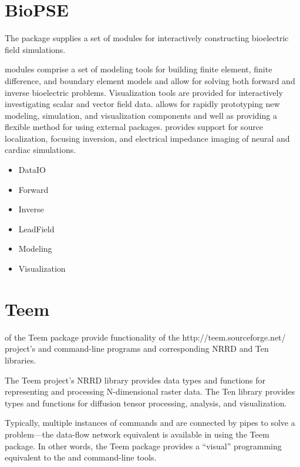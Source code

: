 \section{BioPSE}
\label{sec:biopsepackage}

The \BIOPSE{} package supplies a set of modules for interactively
constructing bioelectric field simulations.

\BIOPSE{} modules comprise a set of modeling tools for building finite element,
finite difference, and boundary element models and allow for solving
both forward and inverse bioelectric problems.  Visualization tools
are provided for interactively investigating scalar and vector field
data.  \BIOPSE{} allows for rapidly prototyping new modeling, simulation,
and visualization components and well as providing a flexible method for using
external packages.  \BIOPSE{} provides support for source localization,
focusing inversion, and electrical impedance imaging of neural and
cardiac simulations.


\begin{itemize}
\item DataIO
\item Forward
\item Inverse
\item LeadField
\item Modeling
\item Visualization
\end{itemize}

\section{Teem}
\label{sec:teempackage}

 of the Teem
package provide functionality of the 
{http://teem.sourceforge.net/} project's  and
 command-line programs and corresponding NRRD and Ten
libraries.

The Teem project's NRRD library provides data types and functions for
representing and processing N-dimensional raster data.  The Ten
library provides types and functions for diffusion tensor processing,
analysis, and visualization.

Typically, multiple instances of commands  and
 are connected by pipes to solve a problem---the
data-flow network equivalent is available in \sr{} using the Teem
package.  In other words, the Teem package provides a
``visual'' programming equivalent to the  and
 command-line tools.


